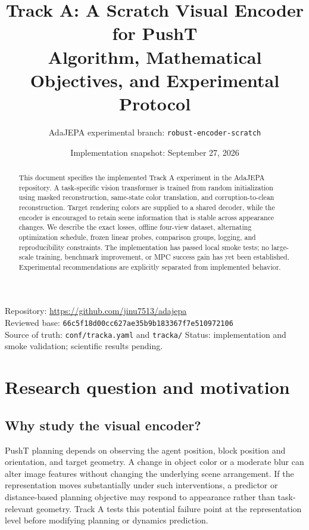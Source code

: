 \documentclass[11pt,a4paper]{article}
\title{\textcolor{accent}{Track A: A Scratch Visual Encoder for PushT}\\[5pt]
\large Algorithm, Mathematical Objectives, and Experimental Protocol}
\author{AdaJEPA experimental branch: \texttt{robust-encoder-scratch}}
\date{Implementation snapshot: September 27, 2026}
\newcommand{\code}[1]{\nolinkurl{#1}}
\begin{document}
\maketitle
\begin{abstract}
This document specifies the implemented Track A experiment in the AdaJEPA repository.
A task-specific vision transformer is trained from random initialization using
masked reconstruction, same-state color translation, and corruption-to-clean
reconstruction. Target rendering colors are supplied to a shared decoder, while
the encoder is encouraged to retain scene information that is stable across
appearance changes. We describe the exact losses, offline four-view dataset,
alternating optimization schedule, frozen linear probes, comparison groups,
logging, and reproducibility constraints. The implementation has passed local
smoke tests; no large-scale training, benchmark improvement, or MPC success gain
has yet been established. Experimental recommendations are explicitly separated
from implemented behavior.
\end{abstract}

\begin{center}
\small
Repository: \url{https://github.com/jinu7513/adajepa}\\
Reviewed base: \code{66c5f18d00cc627ae35b9b183367f7e510972106}\\
Source of truth: \code{conf/tracka.yaml} and \code{tracka/}\newline
Status: implementation and smoke validation; scientific results pending.
\end{center}
\tableofcontents
\newpage

\section{Research question and motivation}
\subsection{Why study the visual encoder?}
PushT planning depends on observing the agent position, block position and
orientation, and target geometry. A change in object color or a moderate blur
can alter image features without changing the underlying scene arrangement.
If the representation moves substantially under such interventions, a predictor
or distance-based planning objective may respond to appearance rather than
task-relevant geometry. Track A tests this potential failure point at the
representation level before modifying planning or dynamics prediction.
\end{document}
